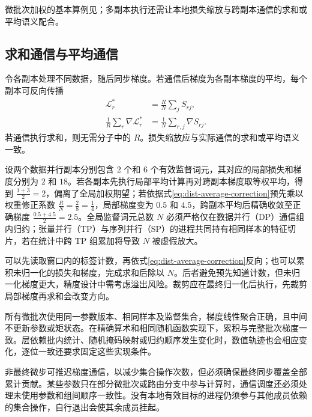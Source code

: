\documentclass[../textbook.tex]{subfiles}
\begin{document}
微批次加权的基本算例见；多副本执行还需让本地损失缩放与跨副本通信的求和或平均语义配合。

\subsection{求和通信与平均通信}
令各副本处理不同数据，随后同步梯度。若通信后梯度为各副本梯度的平均，每个副本可反向传播
\begin{equation}\label{eq:dist-average-correction}
 \begin{aligned}
  \mathcal L_r^* &= \frac{R}{N}\sum_jS_{rj}, \\
  \frac{1}{R}\sum_r\nabla\mathcal L_r^* &= \frac{1}{N}\sum_{r,j}\nabla S_{rj}.
 \end{aligned}
\end{equation}
若通信执行求和，则无需分子中的 $R$。损失缩放应与实际通信的求和或平均语义一致。

设两个数据并行副本分别包含 $2$ 个和 $6$ 个有效监督词元，其对应的局部损失和梯度分别为 $2$ 和 $18$。若各副本先执行局部平均计算再对跨副本梯度取等权平均，得到 $\frac{1+3}{2}=2$，偏离了全局加权期望；若依据式\eqref{eq:dist-average-correction}预先乘以权重修正系数 $\frac{R}{N}=\frac{2}{8}=\frac{1}{4}$，局部梯度变为 $0.5$ 和 $4.5$，跨副本平均后精确收敛至正确梯度 $\frac{0.5+4.5}{2}=2.5$。全局监督词元总数 $N$ 必须严格仅在数据并行（DP）通信组内归约；张量并行（TP）与序列并行（SP）的进程共同持有相同样本的特征切片，若在统计中跨 TP 组累加将导致 $N$ 被虚假放大。

可以先读取窗口内的标签计数，再依式\eqref{eq:dist-average-correction}反向；也可以累积未归一化的损失和梯度，完成求和后除以 $N$。后者避免预先知道计数，但未归一化梯度更大，精度设计中需考虑溢出风险。裁剪应在最终归一化后执行，先裁剪局部梯度再求和会改变方向。

\begin{assumption}[大批次与累积的等价范围]
所有微批次使用同一参数版本、相同样本及监督集合，梯度线性聚合正确，且中间不更新参数或矩状态。在精确算术和相同随机函数实现下，累积与完整批次梯度一致。层依赖批内统计、随机掩码映射或归约顺序发生变化时，数值轨迹也会相应变化，逐位一致还要求固定这些实现条件。
\end{assumption}

非最终微步可推迟梯度通信，以减少集合操作次数，但必须确保最终同步覆盖全部累计贡献。某些参数只在部分微批次或路由分支中参与计算时，通信调度还必须处理未使用参数和组间顺序一致性。没有本地有效目标的进程仍须参与其他成员依赖的集合操作，自行退出会使其余成员挂起。
\end{document}
